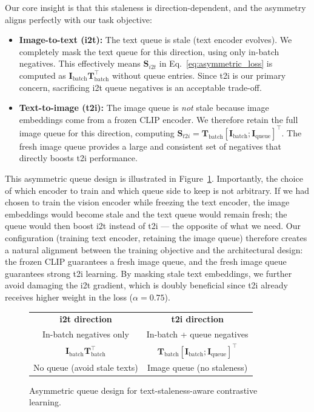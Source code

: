 \documentclass[10pt,leqno]{amsart}
\begin{document}
Our core insight is that this staleness is direction-dependent, and the asymmetry aligns perfectly with our task objective:

\begin{itemize}
    \item \textbf{Image-to-text (i2t):} The text queue is stale (text encoder evolves). We completely mask the text queue for this direction, using only in-batch negatives. This effectively means $\mathbf{S}_{i2t}$ in Eq.~\ref{eq:asymmetric_loss} is computed as $\mathbf{I}_{\text{batch}} \mathbf{T}_{\text{batch}}^{\top}$ without queue entries. Since t2i is our primary concern, sacrificing i2t queue negatives is an acceptable trade-off.
    \item \textbf{Text-to-image (t2i):} The image queue is \emph{not} stale because image embeddings come from a frozen CLIP encoder. We therefore retain the full image queue for this direction, computing $\mathbf{S}_{t2i} = \mathbf{T}_{\text{batch}} [\mathbf{I}_{\text{batch}}; \mathbf{I}_{\text{queue}}]^{\top}$. The fresh image queue provides a large and consistent set of negatives that directly boosts t2i performance.
\end{itemize}

This asymmetric queue design is illustrated in Figure~\ref{fig:queue}. Importantly, the choice of which encoder to train and which queue side to keep is not arbitrary. If we had chosen to train the vision encoder while freezing the text encoder, the image embeddings would become stale and the text queue would remain fresh; the queue would then boost i2t instead of t2i --- the opposite of what we need. Our configuration (training text encoder, retaining the image queue) therefore creates a natural alignment between the training objective and the architectural design: the frozen CLIP guarantees a fresh image queue, and the fresh image queue guarantees strong t2i learning. By masking stale text embeddings, we further avoid damaging the i2t gradient, which is doubly beneficial since t2i already receives higher weight in the loss ($\alpha = 0.75$).

\begin{figure}[h]
\centering
\begin{tabular}{c|c}
\hline
\textbf{i2t direction} & \textbf{t2i direction} \\
In-batch negatives only & In-batch + queue negatives \\
\hline
$\mathbf{I}_{\text{batch}} \mathbf{T}_{\text{batch}}^{\top}$ & $\mathbf{T}_{\text{batch}} [\mathbf{I}_{\text{batch}}; \mathbf{I}_{\text{queue}}]^{\top}$ \\
No queue (avoid stale texts) & Image queue (no staleness) \\
\hline
\end{tabular}
\caption{Asymmetric queue design for text-staleness-aware contrastive learning.}
\label{fig:queue}
\end{figure}
\end{document}

